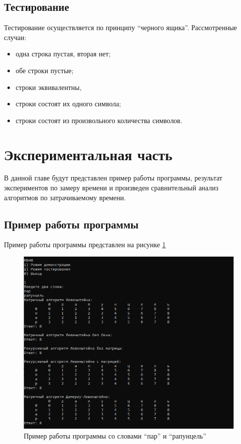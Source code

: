 \documentclass{article}
\begin{document}
	\subsection{Тестирование}
	Тестирование осуществляется по принципу ``черного ящика''.
	Рассмотренные случаи:
	\begin{itemize}
	\item одна строка пустая, вторая нет;
	\item обе строки пустые;
	\item строки эквивалентны,
	\item строки состоят их одного символа;
	\item строки состоят из произвольного количества символов.
	\end{itemize}
	\newpage
	\section{Экспериментальная часть}
	В данной главе будут представлен пример работы программы, результат экспериментов по замеру времени и произведен сравнительный анализ алгоритмов по затрачиваемому времени.
	\subsection{Пример работы программы}
	Пример работы программы представлен на рисунке \ref{programmWork}
	 	\begin{figure}[h!]
		 	\includegraphics[scale=0.9]{programmWork}
		 	\caption{Пример работы программы со словами ``пар'' и ``рапунцель''}
		 	\label{programmWork}
	 	\end{figure}
\end{document}
